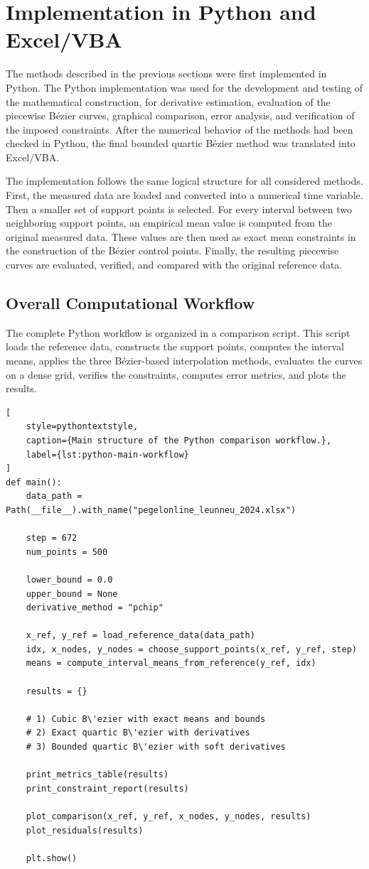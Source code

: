 \documentclass[12pt,a4paper]{article}
\begin{document}
\section{Implementation in Python and Excel/VBA}

The methods described in the previous sections were first implemented in
Python. The Python implementation was used for the development and testing
of the mathematical construction, for derivative estimation, evaluation of
the piecewise B\'ezier curves, graphical comparison, error analysis, and
verification of the imposed constraints. After the numerical behavior of the
methods had been checked in Python, the final bounded quartic B\'ezier
method was translated into Excel/VBA.

The implementation follows the same logical structure for all considered
methods. First, the measured data are loaded and converted into a numerical
time variable. Then a smaller set of support points is selected. For every
interval between two neighboring support points, an empirical mean value is
computed from the original measured data. These values are then used as
exact mean constraints in the construction of the B\'ezier control points.
Finally, the resulting piecewise curves are evaluated, verified, and compared
with the original reference data.

\subsection{Overall Computational Workflow}

The complete Python workflow is organized in a comparison script. This script
loads the reference data, constructs the support points, computes the interval
means, applies the three B\'ezier-based interpolation methods, evaluates the
curves on a dense grid, verifies the constraints, computes error metrics, and
plots the results.

\begin{lstlisting}[
    style=pythontextstyle,
    caption={Main structure of the Python comparison workflow.},
    label={lst:python-main-workflow}
]
def main():
    data_path = Path(__file__).with_name("pegelonline_leunneu_2024.xlsx")

    step = 672
    num_points = 500

    lower_bound = 0.0
    upper_bound = None
    derivative_method = "pchip"

    x_ref, y_ref = load_reference_data(data_path)
    idx, x_nodes, y_nodes = choose_support_points(x_ref, y_ref, step)
    means = compute_interval_means_from_reference(y_ref, idx)

    results = {}

    # 1) Cubic B\'ezier with exact means and bounds
    # 2) Exact quartic B\'ezier with derivatives
    # 3) Bounded quartic B\'ezier with soft derivatives

    print_metrics_table(results)
    print_constraint_report(results)

    plot_comparison(x_ref, y_ref, x_nodes, y_nodes, results)
    plot_residuals(results)

    plt.show()
\end{lstlisting}
\end{document}
